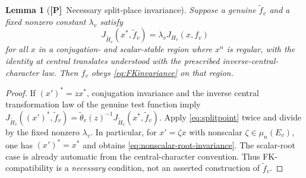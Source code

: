 \documentclass[11pt]{article}
\newcommand{\Ptag}{\textnormal{\textbf{[P]}}}
\theoremstyle{plain}
\newtheorem{lemma}[theorem]{Lemma}
\theoremstyle{definition}
\begin{document}
\begin{lemma}[\Ptag\ Necessary split-place invariance]
\label{lem:FKnecessary}
Suppose a genuine $\widetilde f_v$ and a fixed nonzero constant
$\lambda_v$ satisfy
\begin{equation}\label{eq:splitpoint}
 J_{\widetilde H_v}(x^*,\widetilde f_v)
      =\lambda_v J_{H_v}(x,f_v)
\end{equation}
for all $x$ in a conjugation- and scalar-stable region where
$x^n$ is regular, with the identity at central translates understood
with the prescribed inverse-central-character law.  Then $f_v$ obeys
\eqref{eq:FKinvariance} on that region.
\end{lemma}
\begin{proof}
If $({x'})^*=z x^*$, conjugation invariance and the inverse
central transformation law of the genuine test function imply
$J_{\widetilde H_v}(({x'})^*,\widetilde f_v)
=\widetilde\theta_v(z)^{-1}
J_{\widetilde H_v}(x^*,\widetilde f_v)$.
Apply \eqref{eq:splitpoint} twice and divide by the fixed
nonzero $\lambda_v$.  In particular, for $x'=\zeta x$ with nonscalar
$\zeta\in\mu_n(E_v)$, one has $({x'})^*=x^*$ and obtains
\eqref{eq:nonscalar-root-invariance}.  The scalar-root case is
already automatic from the central-character convention.
Thus FK-compatibility is a \emph{necessary} condition,
not an asserted construction of $\widetilde f_v$.
\end{proof}
\end{document}
